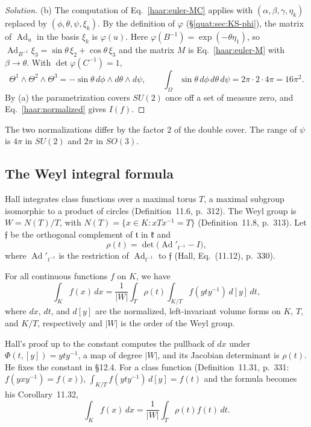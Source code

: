 \begin{proof}[Solution]
(b) The computation of Eq.~\eqref{haar:euler-MC} applies with
$(\alpha,\beta,\gamma,\eta_k)$ replaced by $(\phi,\theta,\psi,\xi_k)$. By
the definition of $\varphi$ (\S\ref{quat:sec:KS-phi}), the matrix of
$\operatorname{Ad}_u$ in the basis $\xi_k$ is $\varphi(u)$. Here
$\varphi(B^{-1})=\exp(-\theta\eta_1)$, so
$\operatorname{Ad}_{B^{-1}}\xi_3=\sin\theta\,\xi_2+\cos\theta\,\xi_3$ and the
matrix $M$ is Eq.~\eqref{haar:euler-M} with $\beta\to\theta$. With
$\det\varphi(C^{-1})=1$,
\begin{equation}
 \Theta^1\wedge\Theta^2\wedge\Theta^3=-\sin\theta\,d\phi\wedge d\theta\wedge d\psi,
 \qquad
 \int_\Omega\sin\theta\,d\phi\,d\theta\,d\psi=2\pi\cdot2\cdot4\pi=16\pi^2 .
\end{equation}
By (a) the parametrization covers $SU(2)$ once off a set of measure zero,
and Eq.~\eqref{haar:normalized} gives $I(f)$.
\end{proof}
The two normalizations differ by the factor $2$ of the double cover. The
range of $\psi$ is $4\pi$ in $SU(2)$ and $2\pi$ in $SO(3)$.

\subsection{The Weyl integral formula}
Hall integrates class functions over a maximal torus $T$, a maximal subgroup
isomorphic to a product of circles (Definition~11.6, p.~312). The Weyl group
is $W=N(T)/T$, with $N(T)=\{x\in K:xTx^{-1}=T\}$ (Definition~11.8, p.~313).
Let $\mathfrak f$ be the orthogonal complement of $\mathfrak t$ in
$\mathfrak k$ and
\begin{equation}\label{haar:weyl-rho}
 \rho(t)=\det\big(\operatorname{Ad}'_{t^{-1}}-I\big),
\end{equation}
where $\operatorname{Ad}'_{t^{-1}}$ is the restriction of
$\operatorname{Ad}_{t^{-1}}$ to $\mathfrak f$ (Hall, Eq.~(11.12), p.~330).
\begin{theorem}\label{haar:thm:weyl}
For all continuous functions $f$ on $K$, we have
\[
 \int_Kf(x)\,dx=\frac1{|W|}\int_T\rho(t)\int_{K/T}f(yty^{-1})\,d[y]\,dt,
\]
where $dx$, $dt$, and $d[y]$ are the normalized, left-invariant volume forms
on $K$, $T$, and $K/T$, respectively and $|W|$ is the order of the Weyl group.
\end{theorem}
Hall's proof up to the constant computes the pullback of $dx$ under
$\Phi(t,[y])=yty^{-1}$, a map of degree $|W|$, and its Jacobian determinant is
$\rho(t)$. He fixes the constant in \S12.4. For a class function
(Definition~11.31, p.~331: $f(yxy^{-1})=f(x)$), $\int_{K/T}f(yty^{-1})\,d[y]=f(t)$
and the formula becomes his Corollary~11.32,
\begin{equation}\label{haar:weyl-class}
 \int_Kf(x)\,dx=\frac1{|W|}\int_T\rho(t)f(t)\,dt .
\end{equation}

